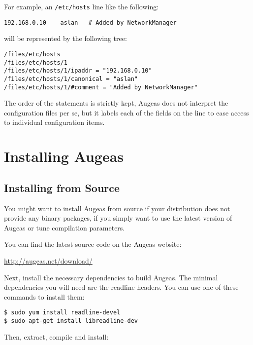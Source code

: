 For example, an \nolinkurl{/etc/hosts} line like the following:

\begin{verbatim}
192.168.0.10    aslan   # Added by NetworkManager
\end{verbatim}

will be represented by the following tree:

\begin{verbatim}
/files/etc/hosts
/files/etc/hosts/1
/files/etc/hosts/1/ipaddr = "192.168.0.10"
/files/etc/hosts/1/canonical = "aslan"
/files/etc/hosts/1/#comment = "Added by NetworkManager"
\end{verbatim}

The order of the statements is strictly kept, Augeas does not interpret the configuration files per se, but it labels each of the fields on the line to ease access to individual configuration items.

\section{Installing Augeas}

\label{sec:installing_augeas} 

\subsection{Installing from Source}


You might want to install Augeas from source if your distribution does not provide any binary packages, if you simply want to use the latest version of Augeas or tune compilation parameters.

You can find the latest source code on the Augeas website:

	\url{http://augeas.net/download/}

Next, install the necessary dependencies to build Augeas. The minimal dependencies you will need are the readline headers. You can use one of these commands to install them:

\begin{verbatim}
$ sudo yum install readline-devel
$ sudo apt-get install libreadline-dev
\end{verbatim}

Then, extract, compile and install:

